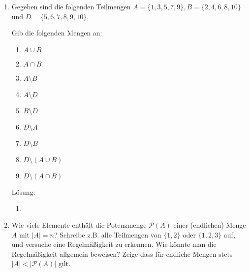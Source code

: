 \documentclass[main.tex]{subfiles}
\begin{document}
\begin{enumerate}
	\item Gegeben sind die folgenden Teilmengen \(A = \{ 1, 3, 5, 7, 9 \}, B = \{2, 4, 6, 8, 10 \} \) und
	      \(D = \{ 5,6,7,8,9,10\} \).

	      Gib die folgenden Mengen an:
	      \begin{multicols}{3}
		      \begin{enumerate}
			      \item \(A \cup B \)
			      \item \(A \cap B \)
			      \item \(A \setminus B \)
			      \item \(A \setminus D \)
			      \item \(B \setminus D \)
			      \item \(D \setminus A \)
			      \item \(D \setminus B \)
			      \item \(D \setminus(A \cup B) \)
			      \item \(D \setminus(A \cap B) \)
		      \end{enumerate}
	      \end{multicols}

	      Lösung:
	      \begin{enumerate}
		      \item
	      \end{enumerate}
	\item Wie viele Elemente enthält die Potenzmenge \( \mathcal{P}(A) \) einer (endlichen)
	      Menge \(A \) mit \( |A| = n \)? Schreibe z.B. alle Teilmengen von \( \{1,2\} \) oder
	      \( \{1,2,3\} \) auf, und versuche eine Regelmäßigkeit zu erkennen.
	      Wie könnte man die Regelmäßigkeit allgemein beweisen?
	      Zeige dass für endliche Mengen stets \( |A| < |\mathcal{P}(A)| \) gilt.


\end{enumerate}
\end{document}
